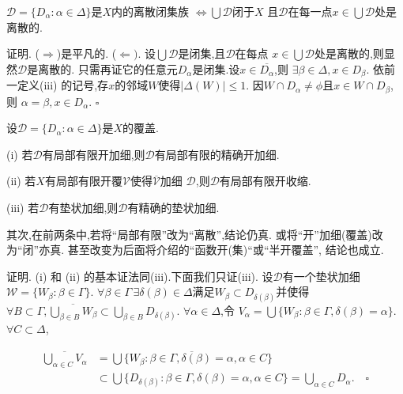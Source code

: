 \documentclass[main.tex]{subfiles}
\begin{document}
\begin{fact}
$\mathscr{D}=\{D_\alpha: \alpha\in \Delta\}$是$X$内的离散闭集族
$\Leftrightarrow\bigcup\mathscr{D}$闭于$X$ 
且$\mathscr{D}$在每一点$x\in\bigcup\mathscr{D}$处是离散的.
\end{fact}
证明. ($\Rightarrow$)是平凡的.
($\Leftarrow)$. 设$\bigcup\mathscr{D}$是闭集,且$\mathscr{D}$在每点
$x\in\bigcup\mathscr{D}$处是离散的,则显然$\mathscr{D}$是离散的.
只需再证它的任意元$D_\alpha$是闭集.设$x\in\overline{D_\alpha}$,则
$\exists\beta\in\Delta, x\in D_\beta$.
依前一定义(iii) 的记号,存$x$的邻域$W$使得$|\Delta(W)|\le 1$. 
因$W\cap D_\alpha \ne \phi$且$x\in W\cap D_\beta$, 则
$\alpha = \beta, x\in D_\alpha$.
$\square$

\begin{fact}
设$\mathscr{D}=\{D_\alpha: \alpha\in \Delta\}$是$X$的覆盖.

\textnormal{(i)} 若$\mathscr{D}$有局部有限开加细,则$\mathscr{D}$有局部有限的精确开加细.

\textnormal{(ii)} 若$X$有局部有限开覆$\mathscr{V}$使得$\mathscr{\overline{V}}$加细
$\mathscr{D}$,则$\mathscr{D}$有局部有限开收缩.

\textnormal{(iii)} 若$\mathscr{D}$有垫状加细,则$\mathscr{D}$有精确的垫状加细.

其次,在前两条中,若将“局部有限”改为“离散”,结论仍真.
或将“开”加细\textnormal{(}覆盖\textnormal{)}改为“闭”亦真.
甚至改变为后面将介绍的“函数开\textnormal{(}集\textnormal{)}“或“半开覆盖”,
结论也成立.
\end{fact}

证明. (i) 和 (ii) 的基本证法同(iii).下面我们只证(iii).
设$\mathscr{D}$有一个垫状加细$\mathscr{W}=\{W_\beta: \beta\in\Gamma\}$.
$\forall\beta\in\Gamma\,\exists \delta(\beta)\in \Delta$满足$W_\beta\subset D_{\delta(\beta)}$并使得
$\forall B\subset\Gamma, \overline{\bigcup_{\beta\in B}W_\beta}\subset 
	\bigcup_{\beta\in B}D_{\delta(\beta)}$.
$\forall \alpha\in \Delta$,令
$V_\alpha=\bigcup\{W_\beta: \beta\in\Gamma, \delta(\beta) = \alpha\}$.
$\forall C\subset\Delta$,

\begin{equation}
\begin{aligned}
\overline{\bigcup_{\alpha\in C}V_\alpha}
	&= \overline{\bigcup \{W_\beta: \beta\in\Gamma, \delta(\beta)=\alpha, \alpha\in C\}}   \\
	&\subset\bigcup \{D_{\delta(\beta)}: \beta\in\Gamma, \delta(\beta)=\alpha, \alpha\in C\} = \bigcup_{\alpha\in C}D_\alpha. \quad\square
\end{aligned}
\end{equation}
\end{document}
